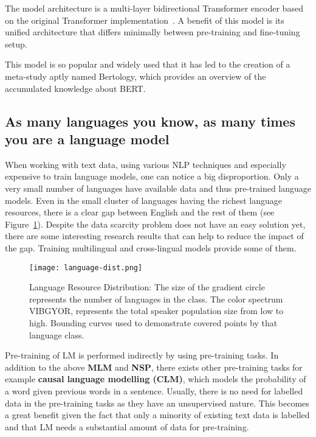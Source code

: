     The model architecture is a multi-layer bidirectional Transformer encoder based on the original Transformer implementation~\parencite{vaswani2017attention}. A benefit of this model is its unified architecture that differs minimally between pre-training and fine-tuning setup. 
    
    This model is so popular and widely used that it has led to the creation of a meta-study aptly named Bertology, which provides an overview of the accumulated knowledge about BERT.~\parencite{Rogers_2020}


\subsection{As many languages you know, as many times you are a language model}
\label{section:multiling-models}
    When working with text data, using various NLP techniques and especially expensive to train language models, one can notice a big disproportion. Only a very small number of languages have available data and thus pre-trained language models. Even in the small cluster of languages having the richest language resources, there is a clear gap between English and the rest of them (see Figure~\ref{fig:lang-dist}). Despite the data scarcity problem does not have an easy solution yet, there are some interesting research results that can help to reduce the impact of the gap. Training multilingual and cross-lingual models provide some of them.
    \begin{figure}[H]
        \texttt{[image: language-dist.png]}
        \centering
        \caption[Language Resource Distribution]{Language Resource Distribution: The size of the gradient circle represents the number of languages in the class. The color spectrum VIBGYOR, represents the total speaker population size from low to high. Bounding curves used to demonstrate covered points by that language class.~\parencite{Joshi_2020}}
        \label{fig:lang-dist}
    \end{figure}
    
    Pre-training of LM is performed indirectly by using pre-training tasks. In addition to the above \textbf{MLM} and \textbf{NSP}, there exists other pre-training tasks for example \textbf{causal language modelling (CLM)}, which models the probability of a word given previous words in a sentence. Usually, there is no need for labelled data in the pre-training tasks as they have an unsupervised nature. This becomes a great benefit given the fact that only a minority of existing text data is labelled and that LM needs a substantial amount of data for pre-training. 

